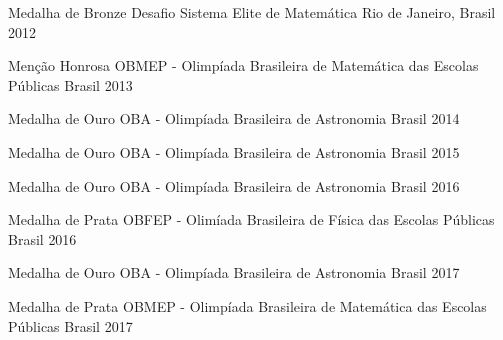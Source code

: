 

\begin{cvhonors}

  \cvhonor
    {Medalha de Bronze} %
    {Desafio Sistema Elite de Matemática} %
    {Rio de Janeiro, Brasil} %
    {2012} %

  \cvhonor
    {Menção Honrosa} %
    {OBMEP - Olimpíada Brasileira de Matemática das Escolas Públicas} %
    {Brasil} %
    {2013} %

  \cvhonor
    {Medalha de Ouro} %
    {OBA - Olimpíada Brasileira de Astronomia} %
    {Brasil} %
    {2014} %

  \cvhonor
    {Medalha de Ouro} %
    {OBA - Olimpíada Brasileira de Astronomia} %
    {Brasil} %
    {2015} %

  \cvhonor
    {Medalha de Ouro} %
    {OBA - Olimpíada Brasileira de Astronomia} %
    {Brasil} %
    {2016} %

  \cvhonor
    {Medalha de Prata} %
    {OBFEP - Olimíada Brasileira de Física das Escolas Públicas} %
    {Brasil} %
    {2016} %

  \cvhonor
    {Medalha de Ouro} %
    {OBA - Olimpíada Brasileira de Astronomia} %
    {Brasil} %
    {2017} %

  \cvhonor
    {Medalha de Prata} %
    {OBMEP - Olimpíada Brasileira de Matemática das Escolas Públicas} %
    {Brasil} %
    {2017} %

\end{cvhonors}
